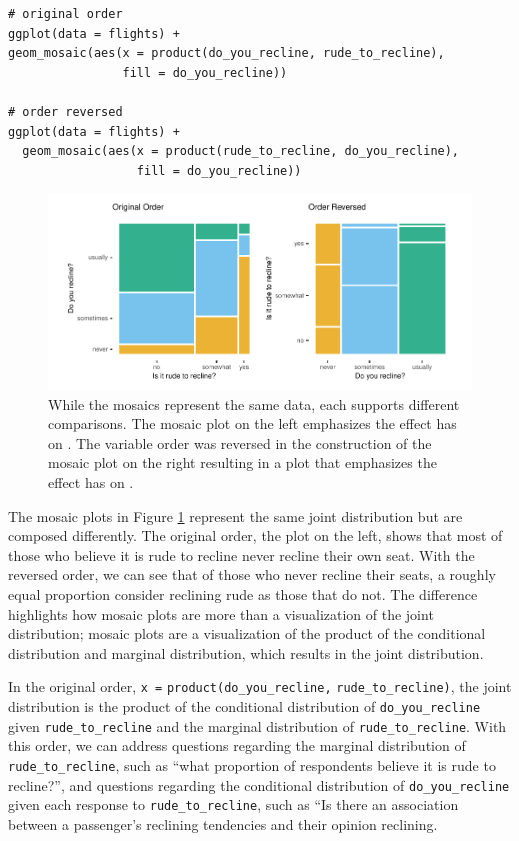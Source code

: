\begin{verbatim}
# original order
ggplot(data = flights) +
geom_mosaic(aes(x = product(do_you_recline, rude_to_recline), 
                fill = do_you_recline))

# order reversed
ggplot(data = flights) +
  geom_mosaic(aes(x = product(rude_to_recline, do_you_recline), 
                  fill = do_you_recline))
\end{verbatim}

\begin{figure}

{\centering \includegraphics[width=1\linewidth]{RJ-2023-013_files/figure-latex/order-1} 

}

\caption{While the mosaics represent the same data, each supports different comparisons. The mosaic plot on the left emphasizes the effect  has on . The variable order was reversed in the construction of the mosaic plot on the right resulting in a plot that emphasizes the effect  has on .}\label{fig:order}
\end{figure}

The mosaic plots in Figure \ref{fig:order} represent the same joint distribution but are composed differently. The original order, the plot on the left, shows that most of those who believe it is rude to recline never recline their own seat. With the reversed order, we can see that of those who never recline their seats, a roughly equal proportion consider reclining rude as those that do not. The difference highlights how mosaic plots are more than a visualization of the joint distribution; mosaic plots are a visualization of the product of the conditional distribution and marginal distribution, which results in the joint distribution.

In the original order, \texttt{x\ =} \texttt{product(do\_you\_recline,} \texttt{rude\_to\_recline)}, the joint distribution is the product of the conditional distribution of \texttt{do\_you\_recline} given \texttt{rude\_to\_recline} and the marginal distribution of \texttt{rude\_to\_recline}. With this order, we can address questions regarding the marginal distribution of \texttt{rude\_to\_recline}, such as ``what proportion of respondents believe it is rude to recline?'', and questions regarding the conditional distribution of \texttt{do\_you\_recline} given each response to \texttt{rude\_to\_recline}, such as ``Is there an association between a passenger's reclining tendencies and their opinion reclining.

